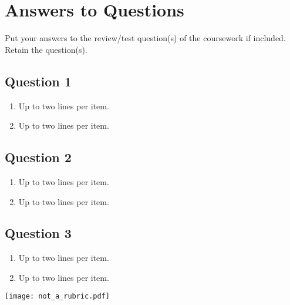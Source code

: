 










\section{Answers to Questions}
\label{sec:ans2ques}

Put your answers to the review/test question(s) of the coursework if included.  Retain the question(s). 

\subsection{Question 1}  
\begin{enumerate}
\item Up to two lines per item.
\item Up to two lines per item.
\end{enumerate}	
	
\subsection{Question 2}  
\begin{enumerate}
\item Up to two lines per item.
\item Up to two lines per item.
\end{enumerate}
	
\subsection{Question 3}  
\begin{enumerate}
\item Up to two lines per item.
\item Up to two lines per item.
\end{enumerate}	







\newpage
\begin{figure*}[!t]
	\texttt{[image: not\_a\_rubric.pdf]} %
\end{figure*}
\cleardoublepage























